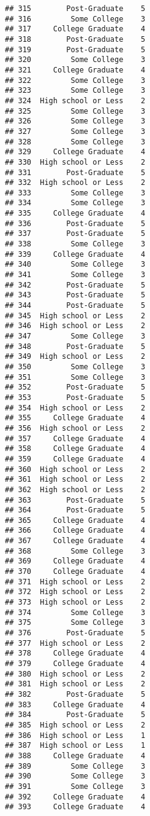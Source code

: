 \documentclass[
]{article}
\begin{document}
\begin{verbatim}
## 315        Post-Graduate    5
## 316         Some College    3
## 317     College Graduate    4
## 318        Post-Graduate    5
## 319        Post-Graduate    5
## 320         Some College    3
## 321     College Graduate    4
## 322         Some College    3
## 323         Some College    3
## 324  High school or Less    2
## 325         Some College    3
## 326         Some College    3
## 327         Some College    3
## 328         Some College    3
## 329     College Graduate    4
## 330  High school or Less    2
## 331        Post-Graduate    5
## 332  High school or Less    2
## 333         Some College    3
## 334         Some College    3
## 335     College Graduate    4
## 336        Post-Graduate    5
## 337        Post-Graduate    5
## 338         Some College    3
## 339     College Graduate    4
## 340         Some College    3
## 341         Some College    3
## 342        Post-Graduate    5
## 343        Post-Graduate    5
## 344        Post-Graduate    5
## 345  High school or Less    2
## 346  High school or Less    2
## 347         Some College    3
## 348        Post-Graduate    5
## 349  High school or Less    2
## 350         Some College    3
## 351         Some College    3
## 352        Post-Graduate    5
## 353        Post-Graduate    5
## 354  High school or Less    2
## 355     College Graduate    4
## 356  High school or Less    2
## 357     College Graduate    4
## 358     College Graduate    4
## 359     College Graduate    4
## 360  High school or Less    2
## 361  High school or Less    2
## 362  High school or Less    2
## 363        Post-Graduate    5
## 364        Post-Graduate    5
## 365     College Graduate    4
## 366     College Graduate    4
## 367     College Graduate    4
## 368         Some College    3
## 369     College Graduate    4
## 370     College Graduate    4
## 371  High school or Less    2
## 372  High school or Less    2
## 373  High school or Less    2
## 374         Some College    3
## 375         Some College    3
## 376        Post-Graduate    5
## 377  High school or Less    2
## 378     College Graduate    4
## 379     College Graduate    4
## 380  High school or Less    2
## 381  High school or Less    2
## 382        Post-Graduate    5
## 383     College Graduate    4
## 384        Post-Graduate    5
## 385  High school or Less    2
## 386  High school or Less    1
## 387  High school or Less    1
## 388     College Graduate    4
## 389         Some College    3
## 390         Some College    3
## 391         Some College    3
## 392     College Graduate    4
## 393     College Graduate    4

\end{verbatim}
\end{document}
